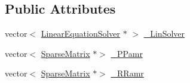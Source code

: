 \subsection*{Public Attributes}
\begin{DoxyCompactItemize}
\item 
vector$<$ \mbox{\hyperlink{classfemus_1_1_linear_equation_solver}{Linear\+Equation\+Solver}} $\ast$ $>$ \mbox{\hyperlink{classfemus_1_1_linear_implicit_system_a58ebbec8ab1f2eb863cba438f30404e0}{\+\_\+\+Lin\+Solver}}
\item 
vector$<$ \mbox{\hyperlink{classfemus_1_1_sparse_matrix}{Sparse\+Matrix}} $\ast$$>$ \mbox{\hyperlink{classfemus_1_1_linear_implicit_system_a472771baff9a159e6128b0fa9d17694c}{\+\_\+\+P\+Pamr}}
\item 
vector$<$ \mbox{\hyperlink{classfemus_1_1_sparse_matrix}{Sparse\+Matrix}} $\ast$$>$ \mbox{\hyperlink{classfemus_1_1_linear_implicit_system_a744017f188e4d4fa89b258640b4c798e}{\+\_\+\+R\+Ramr}}
\end{DoxyCompactItemize}
